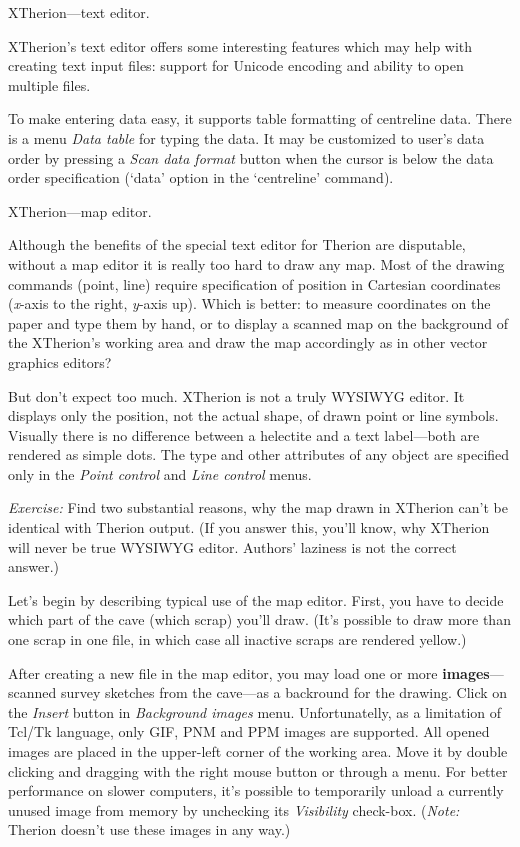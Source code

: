 \subsubchapter XTherion---text editor.

XTherion's text editor offers some interesting features which may help with 
creating text input files: support for Unicode encoding and ability to open 
multiple files. 

To make entering data easy, it supports table formatting of centreline data. 
There is a menu {\it Data table} for typing the data. It may be customized to 
user's data order by pressing a {\it Scan data format} button when the cursor 
is below the data order specification (`data' option in the `centreline' 
command).


\subsubchapter XTherion---map editor.

Although the benefits of the special text editor for Therion are disputable, 
without a map editor it is really too hard to draw any map. Most of the drawing 
commands (point, line) require 
specification of position in Cartesian coordinates ({\it x\/}-axis to the right, 
{\it y\/}-axis up). Which is better: to measure coordinates on the paper and type
them by hand, or to display a scanned map on the background of the XTherion's 
working area and draw the map accordingly as in other vector graphics editors?

But don't expect too much. XTherion is not a truly WYSIWYG editor. It 
displays only the position, not the actual shape, of drawn point or line 
symbols. Visually there is no difference between a helectite and a text 
label---both are rendered as simple dots. The type and other attributes of any 
object are specified only in the {\it Point control} and {\it Line control} menus.


\ifx\pdfoutput\undefined\else
\leavevmode{}\fi
{\it Exercise:} Find two substantial reasons, why the map drawn in XTherion can't be 
identical with Therion output. (If you answer this, you'll know, why XTherion 
will never be true WYSIWYG editor. Authors' laziness is not the correct 
answer.)

Let's begin by describing typical use of the map editor. First, you have 
to decide which part of the cave (which scrap) you'll draw. (It's possible to 
draw more than one scrap in one file, in which case all inactive scraps are rendered 
yellow.)

After creating a new file in the map editor, you may load one or more 
{\bf images}---scanned survey sketches from the cave---as a backround for 
the drawing. Click on the {\it Insert} button in {\it Background images} menu.
Unfortunatelly, as a limitation of Tcl/Tk language, only GIF, PNM and PPM 
images are supported. All opened images are placed in the upper-left corner of 
the working area. Move it by double clicking and dragging with the right 
mouse button or through a menu. For better performance on slower computers, 
it's possible to temporarily unload a currently unused image from memory 
by unchecking its {\it Visibility} check-box. ({\it Note:} Therion doesn't
use these images in any way.)

